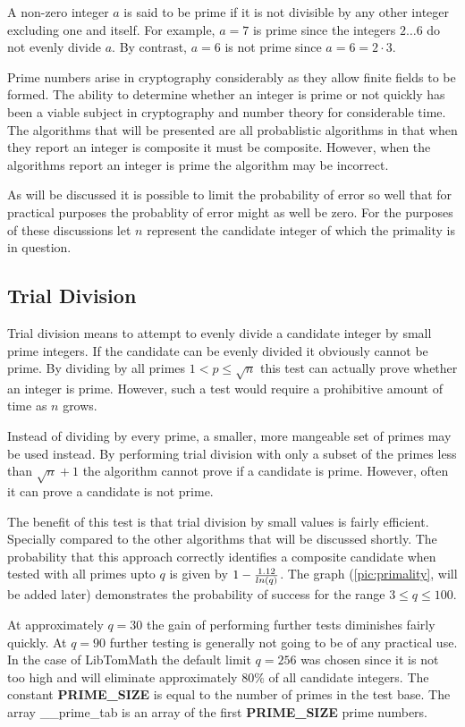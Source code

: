 \documentclass[b5paper]{book}
\begin{document}
A non-zero integer $a$ is said to be prime if it is not divisible by any other integer excluding one and itself.  For example, $a = 7$ is prime 
since the integers $2 \ldots 6$ do not evenly divide $a$.  By contrast, $a = 6$ is not prime since $a = 6 = 2 \cdot 3$. 

Prime numbers arise in cryptography considerably as they allow finite fields to be formed.  The ability to determine whether an integer is prime or
not quickly has been a viable subject in cryptography and number theory for considerable time.  The algorithms that will be presented are all
probablistic algorithms in that when they report an integer is composite it must be composite.  However, when the algorithms report an integer is
prime the algorithm may be incorrect.  

As will be discussed it is possible to limit the probability of error so well that for practical purposes the probablity of error might as 
well be zero.  For the purposes of these discussions let $n$ represent the candidate integer of which the primality is in question.

\subsection{Trial Division}

Trial division means to attempt to evenly divide a candidate integer by small prime integers.  If the candidate can be evenly divided it obviously
cannot be prime.  By dividing by all primes $1 < p \le \sqrt{n}$ this test can actually prove whether an integer is prime.  However, such a test
would require a prohibitive amount of time as $n$ grows.

Instead of dividing by every prime, a smaller, more mangeable set of primes may be used instead.  By performing trial division with only a subset
of the primes less than $\sqrt{n} + 1$ the algorithm cannot prove if a candidate is prime.  However, often it can prove a candidate is not prime.

The benefit of this test is that trial division by small values is fairly efficient.  Specially compared to the other algorithms that will be
discussed shortly.  The probability that this approach correctly identifies a composite candidate when tested with all primes upto $q$ is given by
$1 - {1.12 \over ln(q)}$.  The graph (\ref{pic:primality}, will be added later) demonstrates the probability of success for the range 
$3 \le q \le 100$.  

At approximately $q = 30$ the gain of performing further tests diminishes fairly quickly.  At $q = 90$ further testing is generally not going to 
be of any practical use.  In the case of LibTomMath the default limit $q = 256$ was chosen since it is not too high and will eliminate 
approximately $80\%$ of all candidate integers.  The constant \textbf{PRIME\_SIZE} is equal to the number of primes in the test base.  The 
array \_\_prime\_tab is an array of the first \textbf{PRIME\_SIZE} prime numbers.  
\end{document}
